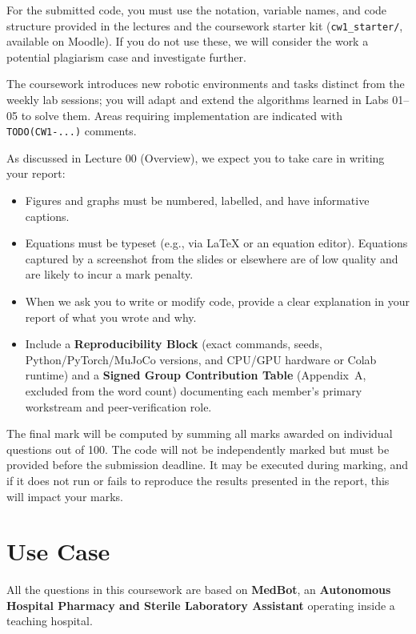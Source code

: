 \documentclass[11pt,a4paper]{article}
\begin{document}
For the submitted code, you must use the notation, variable names, and code structure provided in the lectures and the coursework starter kit (\texttt{cw1\_starter/}, available on Moodle). If you do not use these, we will consider the work a potential plagiarism case and investigate further.

The coursework introduces new robotic environments and tasks distinct from the weekly lab sessions; you will adapt and extend the algorithms learned in Labs 01--05 to solve them. Areas requiring implementation are indicated with \texttt{TODO(CW1-...)} comments.

As discussed in Lecture 00 (Overview), we expect you to take care in writing your report:
\begin{itemize}[leftmargin=1.5em, itemsep=0.2em]
    \item Figures and graphs must be numbered, labelled, and have informative captions.
    \item Equations must be typeset (e.g., via \LaTeX{} or an equation editor). Equations captured by a screenshot from the slides or elsewhere are of low quality and are likely to incur a mark penalty.
    \item When we ask you to write or modify code, provide a clear explanation in your report of what you wrote and why.
    \item Include a \textbf{Reproducibility Block} (exact commands, seeds, Python/PyTorch/MuJoCo versions, and CPU/GPU hardware or Colab runtime) and a \textbf{Signed Group Contribution Table} (Appendix~A, excluded from the word count) documenting each member's primary workstream and peer-verification role.
\end{itemize}

The final mark will be computed by summing all marks awarded on individual questions out of 100. The code will not be independently marked but must be provided before the submission deadline. It may be executed during marking, and if it does not run or fails to reproduce the results presented in the report, this will impact your marks.

\newpage

\section*{Use Case}
All the questions in this coursework are based on \textbf{MedBot}, an \textbf{Autonomous Hospital Pharmacy and Sterile Laboratory Assistant} operating inside a teaching hospital.
\end{document}
